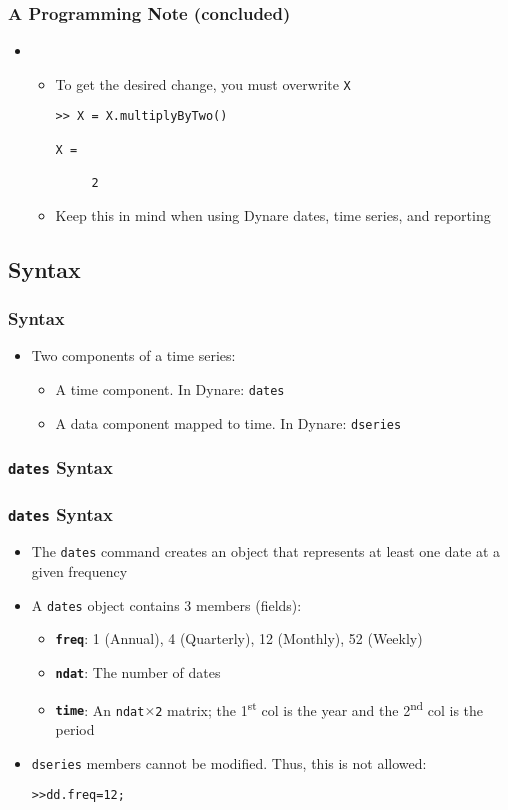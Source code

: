 \documentclass[10pt]{beamer}
\newcommand{\myitem}{\item[$\bullet$]}
\begin{document}
\begin{frame}[fragile,t]
  \frametitle{A Programming Note (concluded)}
  \begin{itemize}
    \item[] \begin{itemize}
    \myitem To get the desired change, you must overwrite \texttt{X}
\begin{verbatim}
>> X = X.multiplyByTwo()

X =

     2
\end{verbatim}
\myitem Keep this in mind when using Dynare dates, time series, and reporting
  \end{itemize}
  \end{itemize}
\end{frame}


\subsection{Syntax}
\begin{frame}[fragile,t]
  \frametitle{Syntax}
  \begin{itemize}
  \myitem Two components of a time series:
    \begin{itemize}
    \myitem A time component. In Dynare: \texttt{dates}
    \myitem A data component mapped to time. In Dynare: \texttt{dseries}
    \end{itemize}
  \end{itemize}
\end{frame}

\subsubsection{\texttt{dates} Syntax}
\begin{frame}[fragile,t]
  \frametitle{\texttt{dates} Syntax}
  \begin{itemize}
    \myitem The \texttt{dates} command creates an object that represents at least one date at a given frequency
    \myitem A \texttt{dates} object contains 3 members (fields):
    \begin{itemize}
      \myitem{\textbf{\texttt{freq}}}: 1 (Annual), 4 (Quarterly), 12 (Monthly), 52 (Weekly)
      \myitem{\textbf{\texttt{ndat}}}: The number of dates
      \myitem{\textbf{\texttt{time}}}: An \texttt{ndat$\times$2} matrix; the 1\textsuperscript{st} col is the year and the 2\textsuperscript{nd} col is the period
    \end{itemize}
    \myitem \texttt{dseries} members cannot be modified. Thus, this is not allowed:
\begin{alltt}
  >> dd.freq = 12;
\end{alltt}
  \end{itemize}
\end{frame}
\end{document}
